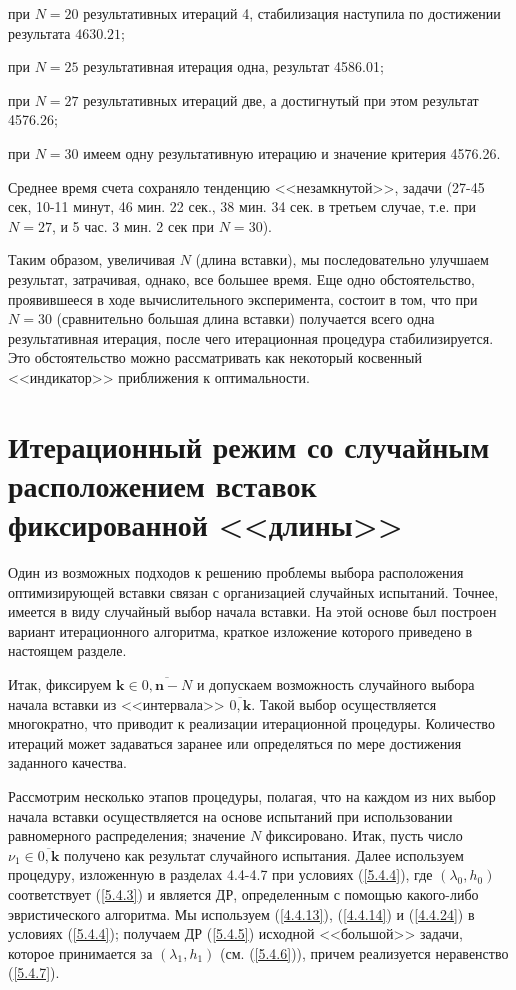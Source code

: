 \documentclass[11pt,twoside,openany]{report}
\begin{document}
{{при $N=20$ результативных итераций 4, стабилизация наступила по достижении результата $4630.21$;

при $N=25$ результативная итерация одна, результат 4586.01;

при $N=27$ результативных итераций две, а достигнутый при этом результат 4576.26;

при $N=30$ имеем одну результативную итерацию и значение критерия 4576.26.

Среднее время счета сохраняло тенденцию <<незамкнутой>>, задачи (27-45 сек, 10-11 минут,
46 мин. 22 сек., 38 мин. 34 сек. в третьем случае, т.е. при $N=27$, и 5 час. 3 мин. 2 сек при $N=30$).

Таким образом, увеличивая $N$ (длина вставки), мы последовательно улучшаем
результат, затрачивая, однако, все большее время. Еще одно обстоятельство,
проявившееся в ходе вычислительного эксперимента, состоит в том, что при
$N=30$ (сравнительно большая длина вставки) получается всего одна результативная
итерация, после чего итерационная процедура стабилизируется. Это обстоятельство
можно рассматривать как некоторый косвенный <<индикатор>> приближения к
оптимальности.

{\raggedright\section{
  Итерационный режим со случайным расположением вставок фиксированной <<длины>>
}}
\label{sect:5.5}
\setcounter{equation}{0}

Один из возможных подходов к решению проблемы выбора расположения оптимизирующей
вставки связан с организацией случайных испытаний. Точнее, имеется в виду
случайный выбор начала вставки. На этой основе был построен вариант итерационного
алгоритма, краткое изложение которого приведено в настоящем разделе.

Итак, фиксируем $\mathbf{k}\in \overline{0,\mathbf{n}-N}$ и допускаем возможность
случайного выбора начала вставки из <<интервала>> $\overline{0,\mathbf{k}}$. Такой
выбор осуществляется многократно, что приводит к реализации итерационной
процедуры. Количество итераций может задаваться заранее или определяться
по мере достижения заданного качества.

Рассмотрим несколько этапов процедуры, полагая, что на каждом из них выбор
начала вставки осуществляется на основе испытаний при использовании равномерного
распределения; значение $N$ фиксировано. Итак, пусть число $\nu_1\in \overline{0,\mathbf{k}}$
получено как результат случайного испытания. Далее используем процедуру,
изложенную в разделах 4.4-4.7 при условиях (\ref{5.4.4}), где $(\lambda_0,h_0)$
соответствует (\ref{5.4.3}) и является ДР, определенным с помощью какого-либо
эвристического алгоритма. Мы используем (\ref{4.4.13}), (\ref{4.4.14}) и
(\ref{4.4.24}) в условиях (\ref{5.4.4}); получаем ДР (\ref{5.4.5}) исходной
<<большой>> задачи, которое принимается за $(\lambda_1,h_1)$ (см. (\ref{5.4.6})),
причем реализуется неравенство (\ref{5.4.7}).

}}
\end{document}
